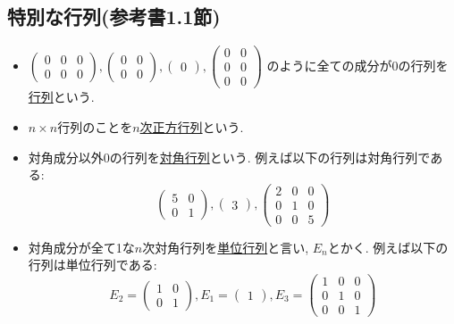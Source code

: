 \documentclass[dvipdfmx,a4paper,11pt]{article}
\theoremstyle{definition}
\begin{document}
\subsection{特別な行列(参考書1.1節)}
\begin{itemize}
\item  $
 \begin{pmatrix}
0 &0&0\\
0 &0&0
 \end{pmatrix}, 
  \begin{pmatrix}
0 &0\\
0 &0
 \end{pmatrix}, 
   \begin{pmatrix}
0 
 \end{pmatrix}, 
   \begin{pmatrix}
0 &0\\
0 &0 \\
0&0
 \end{pmatrix}
 $
 のように全ての成分が0の行列を\underline{行列}という.
 \item $n \times n$行列のことを\underline{$n$次正方行列}という.
 \item 対角成分以外0の行列を\underline{対角行列}という. 例えば以下の行列は対角行列である:
  $$
 \begin{pmatrix}
5&0\\
0 &1
 \end{pmatrix}, 
  \begin{pmatrix}
3
 \end{pmatrix}, 
   \begin{pmatrix}
2&0 &0\\
0 &1 &0\\
0&0&5
 \end{pmatrix}
 $$
 \item 対角成分が全て1な$n$次対角行列を\underline{単位行列}と言い, $E_n$とかく. 例えば以下の行列は単位行列である:
   $$
   E_2 =
 \begin{pmatrix}
1&0\\
0 &1
 \end{pmatrix}, 
 E_1=
  \begin{pmatrix}
1
 \end{pmatrix}, 
 E_3=
   \begin{pmatrix}
1&0 &0\\
0 &1 &0\\
0&0&1
 \end{pmatrix}
 $$
\end{itemize}

\newpage
\end{document}
